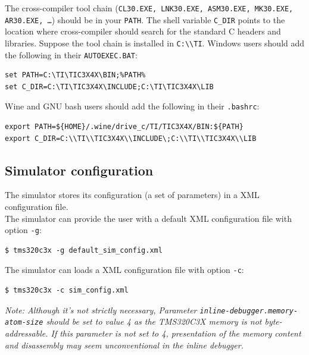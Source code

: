 The cross-compiler tool chain (\texttt{CL30.EXE, LNK30.EXE, ASM30.EXE, MK30.EXE, AR30.EXE, \ldots}) should be in your \texttt{PATH}.
The shell variable \texttt{C\_DIR} points to the location where cross-compiler should search for the standard C headers and libraries.
Suppose the tool chain is installed in \texttt{C:{\textbackslash\textbackslash}TI}.
Windows users should add the following in their \texttt{AUTOEXEC.BAT}:
\begin{verbatim}
set PATH=C:\TI\TIC3X4X\BIN;%PATH%
set C_DIR=C:\TI\TIC3X4X\INCLUDE;C:\TI\TIC3X4X\LIB
\end{verbatim}
Wine and GNU bash users should add the following in their \texttt{.bashrc}:
\begin{verbatim}
export PATH=${HOME}/.wine/drive_c/TI/TIC3X4X/BIN:${PATH}
export C_DIR=C:\\TI\\TIC3X4X\\INCLUDE\;C:\\TI\\TIC3X4X\\LIB
\end{verbatim}

\subsection{Simulator configuration}
\label{tms320c3x_configuration}

\noindent The simulator stores its configuration (a set of parameters) in a XML configuration file. 
\newline\\
\noindent The simulator can provide the user with a default XML configuration file with option \texttt{-g}:

\begin{verbatim}
$ tms320c3x -g default_sim_config.xml
\end{verbatim}

\noindent The simulator can loads a XML configuration file with option \texttt{-c}:

\begin{verbatim}
$ tms320c3x -c sim_config.xml
\end{verbatim}

\noindent \textit{Note: Although it's not strictly necessary, Parameter \texttt{inline-debugger.memory-atom-size} should be set to value 4 as the TMS320C3X memory is not byte-addressable. If this parameter is not set to 4, presentation of the memory content and disassembly may seem unconventional in the inline debugger.}

